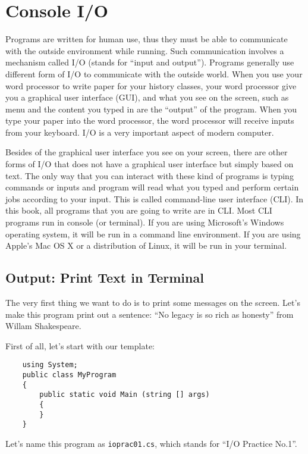 \documentclass[../main.tex]{subfiles}
\begin{document}
    \section{Console I/O}
    Programs are written for human use, thus they must be able to communicate with
    the outside environment while running. Such communication involves a mechanism
    called I/O (stands for ``input and output''). Programs generally use different
    form of I/O to communicate with the outside world. When you use your word
    processor to write paper for your history classes, your word processor give
    you a graphical user interface (GUI), and what you see on the screen,
    such as menu and the content you typed in are the ``output'' of the program.
    When you type your paper into the word processor, the word processor will
    receive inputs from your keyboard. I/O is a very important aspect of modern
    computer.

    Besides of the graphical user interface you see on your screen, there are
    other forms of I/O that does not have a graphical user interface but simply
    based on text. The only way that you can interact with these kind of programs
    is typing commands or inputs and program will read what you typed and perform
    certain jobs according to your input. This is called command-line user
    interface (CLI). In this book, all programs that you are going to write are
    in CLI. Most CLI programs run in console (or terminal). If you are using
    Microsoft's Windows operating system, it will be run in a command line
    environment. If you are using Apple's Mac OS X or a distribution of Linux,
    it will be run in your terminal.

    \subsection{Output: Print Text in Terminal}
    The very first thing we want to do is to print some messages on the screen.
    Let's make this program print out a sentence: ``No legacy is so rich as honesty'' from
    Willam Shakespeare.

    First of all, let's start with our template:

    \begin{verbatim}
    using System;
    public class MyProgram
    {
        public static void Main (string [] args)
        {
        }
    }
    \end{verbatim}

    Let's name this program as \texttt{ioprac01.cs}, which stands for ``I/O
    Practice No.1''.
\end{document}
